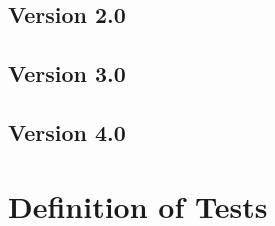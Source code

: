 \documentclass{article}
\begin{document}
\subsection{Version 2.0}

\subsection{Version 3.0}

\subsection{Version 4.0}


\section{Definition of Tests}
\end{document}

